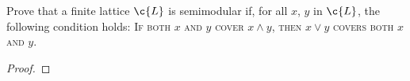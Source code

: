 \prob
{
    Prove that a finite lattice $\c{L}$ is semimodular if, for all $x$, $y$ in $\c{L}$, the following condition holds:\pn
    \;\;\textsc{If both $x$ and $y$ cover $x \wedge y$, then $x \vee y$ covers both $x$ and $y$}.
}
\begin{proof}
\end{proof}